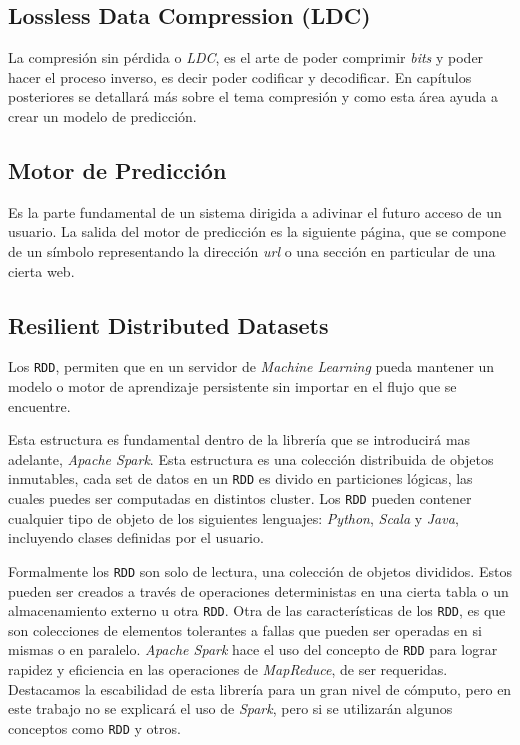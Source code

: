 \subsection{Lossless Data Compression (LDC)} \label{concept-LDC}

La compresión sin pérdida o \emph{LDC}, es el arte de poder comprimir \emph{bits} y poder hacer el proceso inverso, es decir poder codificar y decodificar. En capítulos posteriores se detallará más sobre el tema compresión y como esta área ayuda a crear un modelo de predicción.





\subsection{Motor de Predicción}\label{concept-enginepredict}

Es la parte fundamental de un sistema dirigida a adivinar el futuro acceso de un usuario. La salida del motor de predicción es la siguiente página, que se compone de un símbolo representando la dirección \emph{url} o una sección en particular de una cierta web. 

 


\subsection{Resilient Distributed Datasets }\label{concept-RDD}

	Los \texttt{RDD}, permiten que en un servidor de \emph{Machine Learning } pueda mantener un modelo o motor de aprendizaje persistente sin importar en el flujo que se encuentre.

	Esta estructura es fundamental dentro de la librería que se introducirá mas adelante, \emph{Apache Spark}. Esta estructura es una colección distribuida de objetos inmutables, cada 
	set de datos en un \texttt{RDD} es divido en particiones lógicas, las cuales puedes ser computadas en distintos cluster. Los \texttt{RDD} pueden contener cualquier tipo de objeto de los siguientes lenguajes: \emph{Python}, \emph{Scala} y \emph{Java}, incluyendo clases definidas por el usuario. 

	Formalmente los \texttt{RDD} son solo de lectura, una colección de objetos divididos. Estos pueden ser creados a través de  operaciones deterministas en una cierta tabla o un almacenamiento externo u otra \texttt{RDD}.
	Otra de las características de los \texttt{RDD}, es que son colecciones de elementos tolerantes a fallas que pueden ser operadas en si mismas o en paralelo.
	\emph{Apache Spark} hace el uso del concepto de \texttt{RDD} para lograr rapidez y eficiencia en las operaciones de \emph{MapReduce}, de ser requeridas. Destacamos la escabilidad de esta librería para un gran nivel de cómputo, pero en este trabajo no se explicará el uso de \emph{Spark}, pero si se utilizarán algunos conceptos como \texttt{RDD} y otros.




